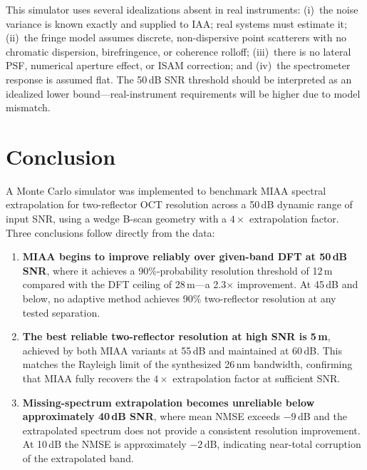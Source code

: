 \documentclass[conference]{IEEEtran}
\begin{document}
This simulator uses several idealizations absent in real instruments:
(i)~the noise variance is known exactly and supplied to IAA; real
systems must estimate it; (ii)~the fringe model assumes discrete,
non-dispersive point scatterers with no chromatic dispersion,
birefringence, or coherence rolloff; (iii)~there is no lateral PSF,
numerical aperture effect, or ISAM correction; and (iv)~the
spectrometer response is assumed flat. The 50\,dB SNR threshold should
be interpreted as an idealized lower bound---real-instrument requirements
will be higher due to model mismatch.

\section{Conclusion}

A Monte Carlo simulator was implemented to benchmark MIAA spectral
extrapolation for two-reflector OCT resolution across a 50\,dB dynamic
range of input SNR, using a wedge B-scan geometry with a $4\times$
extrapolation factor. Three conclusions follow directly from the data:

\begin{enumerate}

  \item \textbf{MIAA begins to improve reliably over given-band DFT at
    50\,dB SNR}, where it achieves a 90\%-probability resolution
    threshold of 12\,\textmu m compared with the DFT ceiling of
    28\,\textmu m---a 2.3$\times$ improvement. At 45\,dB and below, no
    adaptive method achieves 90\% two-reflector resolution at any tested
    separation.

  \item \textbf{The best reliable two-reflector resolution at high SNR
    is 5\,\textmu m}, achieved by both MIAA variants at 55\,dB and
    maintained at 60\,dB. This matches the Rayleigh limit of the
    synthesized 26\,nm bandwidth, confirming that MIAA fully recovers
    the $4\times$ extrapolation factor at sufficient SNR.

  \item \textbf{Missing-spectrum extrapolation becomes unreliable below
    approximately 40\,dB SNR}, where mean NMSE exceeds $-9$\,dB and
    the extrapolated spectrum does not provide a consistent resolution
    improvement. At 10\,dB the NMSE is approximately $-2$\,dB,
    indicating near-total corruption of the extrapolated band.

\end{enumerate}
\end{document}
